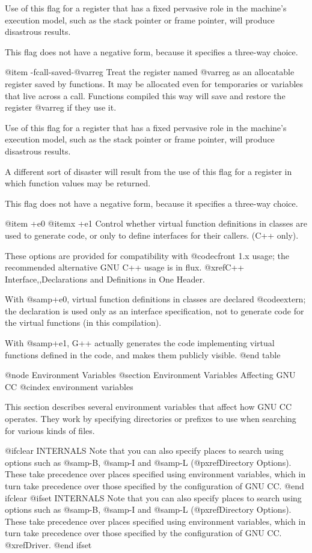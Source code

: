 {{Use of this flag for a register that has a fixed pervasive role in the
machine's execution model, such as the stack pointer or frame pointer,
will produce disastrous results.

This flag does not have a negative form, because it specifies a
three-way choice.

@item -fcall-saved-@var{reg}
Treat the register named @var{reg} as an allocatable register saved by
functions.  It may be allocated even for temporaries or variables that
live across a call.  Functions compiled this way will save and restore
the register @var{reg} if they use it.

Use of this flag for a register that has a fixed pervasive role in the
machine's execution model, such as the stack pointer or frame pointer,
will produce disastrous results.

A different sort of disaster will result from the use of this flag for
a register in which function values may be returned.

This flag does not have a negative form, because it specifies a
three-way choice.

@item +e0
@itemx +e1
Control whether virtual function definitions in classes are used to
generate code, or only to define interfaces for their callers.  (C++
only).

These options are provided for compatibility with @code{cfront} 1.x
usage; the recommended alternative GNU C++ usage is in flux.  @xref{C++
Interface,,Declarations and Definitions in One Header}.

With @samp{+e0}, virtual function definitions in classes are declared
@code{extern}; the declaration is used only as an interface
specification, not to generate code for the virtual functions (in this
compilation).

With @samp{+e1}, G++ actually generates the code implementing virtual
functions defined in the code, and makes them publicly visible.
@end table

@node Environment Variables
@section Environment Variables Affecting GNU CC
@cindex environment variables

This section describes several environment variables that affect how GNU
CC operates.  They work by specifying directories or prefixes to use
when searching for various kinds of files.

@ifclear INTERNALS
Note that you can also specify places to search using options such as
@samp{-B}, @samp{-I} and @samp{-L} (@pxref{Directory Options}).  These
take precedence over places specified using environment variables, which
in turn take precedence over those specified by the configuration of GNU
CC. 
@end ifclear
@ifset INTERNALS
Note that you can also specify places to search using options such as
@samp{-B}, @samp{-I} and @samp{-L} (@pxref{Directory Options}).  These
take precedence over places specified using environment variables, which
in turn take precedence over those specified by the configuration of GNU
CC.  @xref{Driver}.
@end ifset

}}
